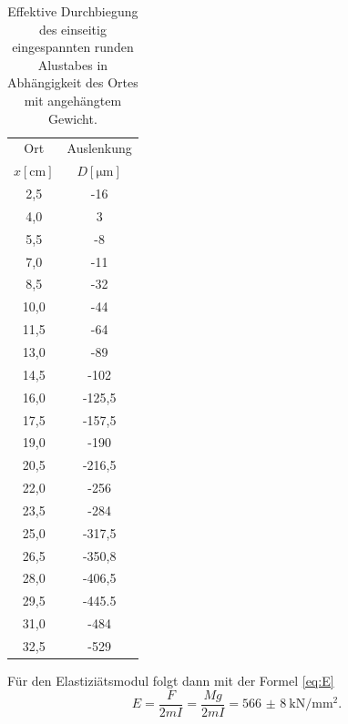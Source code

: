 \documentclass[
  bibliography=totoc,     %
  captions=tableheading,  %
  titlepage=firstiscover, %
]{scrartcl}
\begin{document}
\begin{table}[H]
    \centering
    \caption{Effektive Durchbiegung des einseitig eingespannten runden Alustabes in Abhängigkeit des Ortes mit angehängtem Gewicht.}
    \begin{tabular}{cc}
        \toprule
        {Ort} & {Auslenkung} \\
        {$x[\si{\centi\metre}]$} & {$D[\si{\micro\metre}]$} \\
        \midrule
         2,5 &  -16 \\
         4,0 &    3 \\
         5,5 &   -8 \\
         7,0 &  -11 \\
         8,5 &  -32 \\
        10,0 &  -44 \\
        11,5 &  -64 \\
        13,0 &  -89 \\
        14,5 & -102 \\
        16,0 &-125,5\\
        17,5 &-157,5\\
        19,0 & -190 \\
        20,5 &-216,5\\
        22,0 & -256 \\
        23,5 & -284 \\
        25,0 &-317,5\\
        26,5 &-350,8\\
        28,0 &-406,5\\
        29,5 &-445.5\\
        31,0 & -484 \\
        32,5 & -529 \\
        \bottomrule
    \end{tabular}
    \label{tab2:alurund}
\end{table}
Für den Elastiziätsmodul folgt dann mit der Formel \ref{eq:E}
\begin{equation}
    E = \frac{F}{2mI} = \frac{Mg}{2mI} = \SI{566(8)}{\kilo\newton\per\milli\metre\squared}.
\end{equation}
\end{document}
